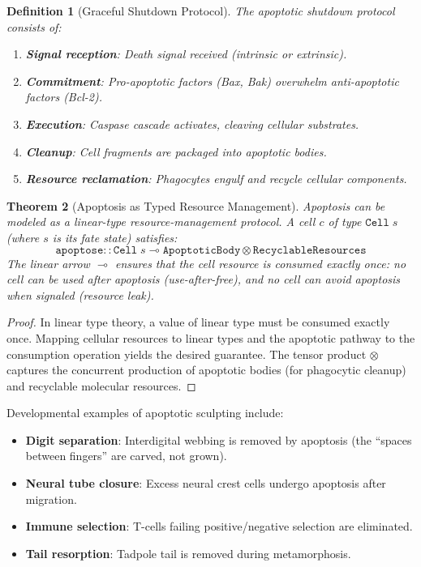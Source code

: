 \documentclass[12pt,a4paper]{article}
\newtheorem{theorem}{Theorem}[section]
\newtheorem{definition}[theorem]{Definition}
\begin{document}
\begin{definition}[Graceful Shutdown Protocol]\label{def:shutdown}
The apoptotic shutdown protocol consists of:
\begin{enumerate}
  \item \textbf{Signal reception}: Death signal received
    (intrinsic or extrinsic).
  \item \textbf{Commitment}: Pro-apoptotic factors
    (Bax, Bak) overwhelm anti-apoptotic factors (Bcl-2).
  \item \textbf{Execution}: Caspase cascade activates,
    cleaving cellular substrates.
  \item \textbf{Cleanup}: Cell fragments are packaged
    into apoptotic bodies.
  \item \textbf{Resource reclamation}: Phagocytes engulf
    and recycle cellular components.
\end{enumerate}
\end{definition}

\begin{theorem}[Apoptosis as Typed Resource Management]\label{thm:apoptosis-typed}
Apoptosis can be modeled as a linear-type resource-management
protocol.  A cell $c$ of type $\texttt{Cell}\;s$ (where $s$ is
its fate state) satisfies:
\[
  \texttt{apoptose} :: \texttt{Cell}\;s \multimap
    \texttt{ApoptoticBody} \otimes \texttt{RecyclableResources}
\]
The linear arrow $\multimap$ ensures that the cell resource is
\emph{consumed exactly once}: no cell can be used after apoptosis
(use-after-free), and no cell can avoid apoptosis when signaled
(resource leak).
\end{theorem}

\begin{proof}
In linear type theory, a value of linear type must be consumed
exactly once.  Mapping cellular resources to linear types and the
apoptotic pathway to the consumption operation yields the desired
guarantee.  The tensor product $\otimes$ captures the concurrent
production of apoptotic bodies (for phagocytic cleanup) and
recyclable molecular resources.
\end{proof}

Developmental examples of apoptotic sculpting include:
\begin{itemize}[leftmargin=2em]
  \item \textbf{Digit separation}: Interdigital webbing is removed
    by apoptosis (the ``spaces between fingers'' are carved, not grown).
  \item \textbf{Neural tube closure}: Excess neural crest cells
    undergo apoptosis after migration.
  \item \textbf{Immune selection}: T-cells failing positive/negative
    selection are eliminated.
  \item \textbf{Tail resorption}: Tadpole tail is removed during
    metamorphosis.
\end{itemize}
\end{document}
